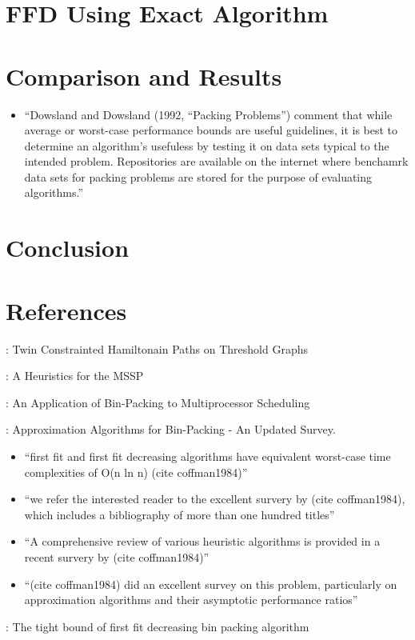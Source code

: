 \documentclass[oribibl]{llncs}
\begin{document}
\section{FFD Using Exact Algorithm}
\label{sec:ffdexact}

\section{Comparison and Results}
\label{sec:compresult}

\begin{itemize}
	\item ``Dowsland and Dowsland (1992, ``Packing Problems'') comment that while average or worst-case performance bounds are useful guidelines, it is best to determine an algorithm's usefuless by testing it on data sets typical to the intended problem. Repositories are available on the internet where benchamrk data sets for packing problems are stored for the purpose of evaluating algorithms.''
\end{itemize}

\section{Conclusion}
\label{sec:conclusion}


\section{References}
\cite{becker2010}: Twin Constrainted Hamiltonain Paths on Threshold Graphs 

\cite{becker2015}: A Heuristics for the MSSP

\cite{coffman1978}: An Application of Bin-Packing to Multiprocessor Scheduling

\cite{coffman1984}: Approximation Algorithms for Bin-Packing - An Updated Survey.
\begin{itemize}
	\item ``first fit and first fit decreasing algorithms have equivalent worst-case time complexities of O(n ln n) (cite coffman1984)''
	\item ``we refer the interested reader to the excellent survery by (cite coffman1984), which includes a bibliography of more than one hundred titles''
	\item ``A comprehensive review of various heuristic algorithms is provided in a recent survery by (cite coffman1984)''
	\item ``(cite coffman1984) did an excellent survey on this problem, particularly on approximation algorithms and their asymptotic performance ratios''
\end{itemize}
\cite{dosa2007}: The tight bound of first fit decreasing bin packing algorithm
\end{document}
